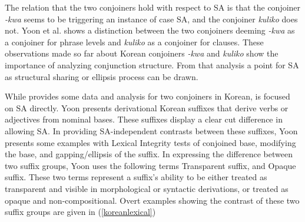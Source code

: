 The relation that the two conjoiners hold with respect to SA is that the conjoiner \textit{-kwa} seems to be triggering an instance of case SA, and the conjoiner \textit{kuliko} does not. Yoon et al. shows a distinction between the two conjoiners deeming \textit{-kwa} as a conjoiner for phrase levels and \textit{kuliko} as a conjoiner for clauses. These observations made so far about Korean conjoiners \textit{-kwa} and \textit{kuliko} show the importance of analyzing conjunction structure. From that analysis a point for SA as structural sharing or ellipsis process can be drawn. 

While \cite{yoon2005conjunction} provides some data and analysis for two conjoiners in Korean, \cite{yoon2017lexical} is focused on SA directly. Yoon presents derivational Korean suffixes that derive verbs or adjectives from nominal bases. These suffixes display a clear cut difference in allowing SA. In providing SA-independent contrasts between these suffixes, Yoon presents some examples with Lexical Integrity tests of conjoined base, modifying the base, and gapping/ellipsis of the suffix. In expressing the difference between two suffix groups, Yoon uses the following terms Transparent suffix, and Opaque suffix. These two terms represent a suffix's ability to be either treated as transparent and visible in morphological or syntactic derivations, or treated as opaque and non-compositional. Overt examples showing the contrast of these two suffix groups are given in (\ref{koreanlexical})


